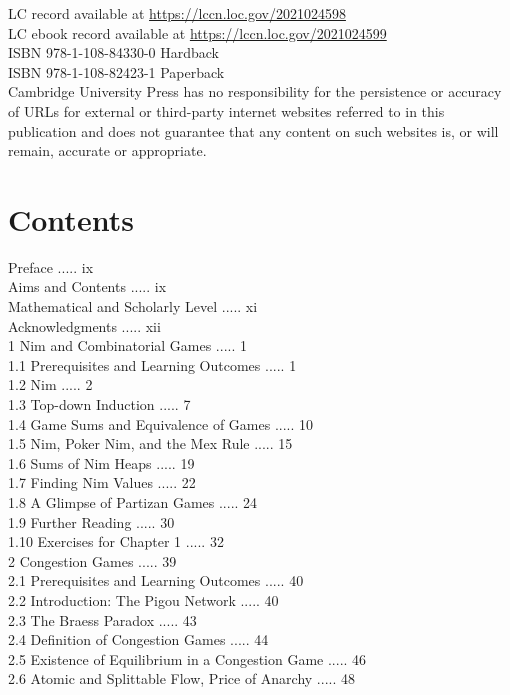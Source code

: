 \documentclass[12pt]{article}
\begin{document}
LC record available at \href{https://lccn.loc.gov/2021024598}{https://lccn.loc.gov/2021024598}\\
LC ebook record available at \href{https://lccn.loc.gov/2021024599}{https://lccn.loc.gov/2021024599}\\
ISBN 978-1-108-84330-0 Hardback\\
ISBN 978-1-108-82423-1 Paperback\\
Cambridge University Press has no responsibility for the persistence or accuracy of URLs for external or third-party internet websites referred to in this publication and does not guarantee that any content on such websites is, or will remain, accurate or appropriate.

\section*{Contents}
Preface ..... ix\\
Aims and Contents ..... ix\\
Mathematical and Scholarly Level ..... xi\\
Acknowledgments ..... xii\\
1 Nim and Combinatorial Games ..... 1\\
1.1 Prerequisites and Learning Outcomes ..... 1\\
1.2 Nim ..... 2\\
1.3 Top-down Induction ..... 7\\
1.4 Game Sums and Equivalence of Games ..... 10\\
1.5 Nim, Poker Nim, and the Mex Rule ..... 15\\
1.6 Sums of Nim Heaps ..... 19\\
1.7 Finding Nim Values ..... 22\\
1.8 A Glimpse of Partizan Games ..... 24\\
1.9 Further Reading ..... 30\\
1.10 Exercises for Chapter 1 ..... 32\\
2 Congestion Games ..... 39\\
2.1 Prerequisites and Learning Outcomes ..... 40\\
2.2 Introduction: The Pigou Network ..... 40\\
2.3 The Braess Paradox ..... 43\\
2.4 Definition of Congestion Games ..... 44\\
2.5 Existence of Equilibrium in a Congestion Game ..... 46\\
2.6 Atomic and Splittable Flow, Price of Anarchy ..... 48\\
\end{document}
